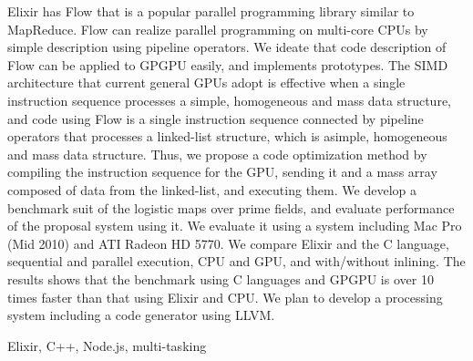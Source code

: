 \documentclass[submit,techrep]{ipsj}
\begin{document}
\begin{eabstract}
Elixir has Flow that is a popular parallel programming library similar to MapReduce. Flow can realize parallel programming on multi-core CPUs by simple description using pipeline operators. We ideate that code description of Flow can be applied to GPGPU easily, and implements prototypes. The SIMD architecture that current general GPUs adopt is effective when a single instruction sequence processes a simple, homogeneous and mass data structure, and code using Flow is a single instruction sequence connected by pipeline operators that processes a linked-list structure, which is asimple, homogeneous and mass data structure. Thus, we propose a code optimization method by compiling the instruction sequence for the GPU, sending it and a mass array composed of data from the linked-list, and executing them. We develop a benchmark suit of the logistic maps over prime fields, and evaluate performance of the proposal system using it. We evaluate it using a system including Mac Pro (Mid 2010) and ATI Radeon HD 5770. We compare Elixir and the C language, sequential and parallel execution, CPU and GPU, and with/without inlining. The results shows that the benchmark using C languages and GPGPU is over 10 times faster than that using Elixir and CPU. We plan to develop a processing system including a code generator using LLVM.
\end{eabstract}

\begin{ekeyword}
Elixir, C++, Node.js, multi-tasking
\end{ekeyword}

\maketitle



\begin{acknowledgment}

\end{acknowledgment}




\end{document}
